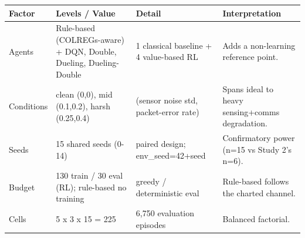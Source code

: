 \begin{tabular}{llll}
\toprule
Factor & Levels / Value & Detail & Interpretation \\
\midrule
Agents & Rule-based (COLREGs-aware) + DQN, Double, Dueling, Dueling-Double & 1 classical baseline + 4 value-based RL & Adds a non-learning reference point. \\
Conditions & clean (0,0), mid (0.1,0.2), harsh (0.25,0.4) & (sensor noise std, packet-error rate) & Spans ideal to heavy sensing+comms degradation. \\
Seeds & 15 shared seeds (0-14) & paired design; env\_seed=42+seed & Confirmatory power (n=15 vs Study 2's n=6). \\
Budget & 130 train / 30 eval (RL); rule-based no training & greedy / deterministic eval & Rule-based follows the charted channel. \\
Cells & 5 x 3 x 15 = 225 & 6,750 evaluation episodes & Balanced factorial. \\
\bottomrule
\end{tabular}
